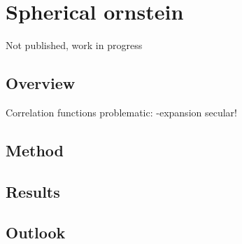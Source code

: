 \documentclass[thesis.tex]{subfiles}
\begin{document}
\chapter{Spherical ornstein}

Not published, work in progress

\section{Overview}

Correlation functions problematic: \ku-expansion secular!

\section{Method}

\section{Results}

\section{Outlook}
\end{document}
